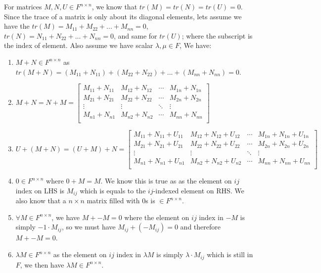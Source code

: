 \documentclass[11pt]{article}
\begin{document}
For matrices $M, N, U \in F^{n \times n}$, we know that $tr(M) = tr(N) = tr(U) = 0$. Since the trace of a matrix is only about its diagonal elements, lets assume we have the $tr(M) = M_{11} + M_{22} + ... +  M_{nn} = 0$, $tr(N) = N_{11} + N_{22} + ... +  N_{nn} = 0$, and same for $tr(U)$; where the subscript is the index of element. Also assume we have scalar $\lambda, \mu \in F$, We have:

\begin{enumerate}
    \item $M + N \in  F^{n \times n}$ as $tr(M + N) = (M_{11} + N_{11}) + (M_{22} + N_{22}) +  ... + (M_{nn} + N_{nn}) = 0$.
    \item $M + N = N + M = \begin{bmatrix}
        M_{11} + N_{11} & M_{12} + N_{12} & \cdots &M_{1n} + N_{1n} \\
        M_{21} + N_{21} & M_{22} + N_{22} & \cdots &M_{2n} + N_{2n} \\
        \vdots & \vdots & \ddots & \vdots \\
        M_{n1} + N_{n1} & M_{n2} + N_{n2} & \cdots &M_{nn} + N_{nn} \\
    \end{bmatrix}$
    \item $U + (M + N) = (U + M) + N = \begin{bmatrix}
        M_{11} + N_{11}+ U_{11} & M_{12} + N_{12}+ U_{12} & \cdots & M_{1n} + N_{1n}+ U_{1n} \\
        M_{21} + N_{21} + U_{21} & M_{22} + N_{22} + U_{22} & \cdots&  M_{2n} + N_{2n} + U_{2n} \\
        \vdots & \vdots & \ddots & \vdots \\
        M_{n1} + N_{n1}+U_{n1} & M_{n2} + N_{n2}+U_{n2} & \cdots & M_{nn} + N_{nn}+U_{nn} \\
    \end{bmatrix}$
    \item $0 \in  F^{n \times n}$ where $0 + M = M$. We know this is true as as the element on $ij$ index on LHS is $M_{ij}$ which is equals to the $ij$-indexed element on RHS. We also know that a $n \times n$ matrix filled with $0$s is $\in  F^{n \times n}$.
    \item $\forall M \in F^{n \times n}$, we have $M + -M = 0$ where the element on $ij$ index in $-M$ is simply $-1 \cdot M_{ij}$, so we must have $M_{ij} + (-M_{ij}) = 0$ and therefore $M + -M = 0$.
    \item $\lambda M \in F^{n \times n}$ as the element on $ij$ index in $\lambda M$ is simply $\lambda \cdot M_{ij}$ which is still in $F$, we then have $\lambda M  \in F^{n \times n}$.

\end{enumerate}
\end{document}
